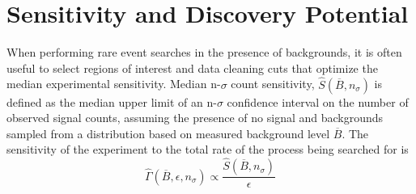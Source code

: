 \documentclass[/main.tex]{subfiles}
\begin{document}
\onlyinsubfile{\appendix}
\chapter{Sensitivity and Discovery Potential}
\label{app:sens}

When performing rare event searches in the presence of backgrounds, it is often useful to select regions of interest and data cleaning cuts that optimize the median experimental sensitivity.
Median n-$\sigma$ count sensitivity, $\hat{S}(\overline{B}, n_\sigma)$ is defined as the median upper limit of an n-$\sigma$ confidence interval on the number of observed signal counts, assuming the presence of no signal and backgrounds sampled from a distribution based on measured background level $\overline{B}$.
The sensitivity of the experiment to the total rate of the process being searched for is
\begin{equation}
  \hat{\Gamma}(\overline{B}, \epsilon, n_\sigma)\propto\frac{\hat{S}(\overline{B}, n_\sigma)}{\epsilon}
\end{equation}
\end{document}
